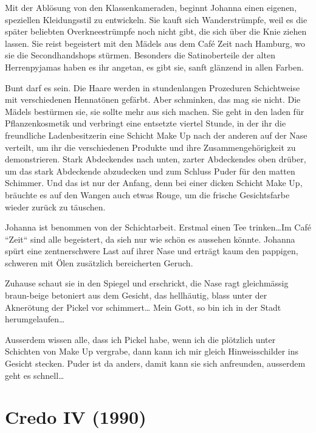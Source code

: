 \documentclass[10pt,titlepage,a5paper]{book}
\begin{document}
Mit der Ablösung von den Klassenkameraden, beginnt Johanna einen eigenen, speziellen Kleidungsstil zu entwickeln. Sie kauft sich Wanderstrümpfe, weil es die später beliebten Overkneestrüm\-pfe noch nicht gibt, die sich über die Knie ziehen lassen. Sie reist begeistert mit den Mädels aus dem Café Zeit nach Hamburg, wo sie die Secondhandshops stürmen. Besonders die Satinoberteile der alten Herrenpyjamas haben es ihr angetan, es gibt sie, sanft glänzend in allen Farben. 

Bunt darf es sein. Die Haare werden in stundenlangen Prozeduren Schichtweise mit verschiedenen Hennatönen gefärbt. Aber schminken, das mag sie nicht. Die Mädels bestürmen sie, sie sollte mehr aus sich machen. Sie geht in den laden für Pflanzenkosmetik und verbringt eine entsetzte viertel Stunde, in der ihr die freundliche Ladenbesitzerin eine Schicht Make Up nach der anderen auf der Nase verteilt, um ihr die verschiedenen Produkte und ihre Zusammengehörigkeit zu demonstrieren. Stark Abdeckendes nach unten, zarter Abdeckendes oben drüber, um das stark Abdeckende abzudecken und zum Schluss Puder für den matten Schimmer. Und das ist nur der Anfang, denn bei einer dicken Schicht Make Up, bräuchte es auf den Wangen auch etwas Rouge, um die frische Gesichtsfarbe wieder zurück zu täuschen. 

Johanna ist benommen von der Schichtarbeit. Erstmal einen Tee trinken\dots  Im Café ``Zeit`` sind alle begeistert, da sieh nur wie schön es aussehen könnte. Johanna spürt eine zentnerschwere Last auf ihrer Nase und erträgt kaum den pappigen, schweren mit Ölen zusätzlich bereicherten Geruch.

Zuhause schaut sie in den Spiegel und erschrickt, die Nase ragt gleichmässig braun-beige betoniert aus dem Gesicht, das hell\-häutig, blass unter der Aknerötung der Pickel vor schimmert\dots{} Mein Gott, so bin ich in der Stadt herumgelaufen\dots 

Ausserdem wissen alle, dass ich Pickel habe, wenn ich die plötzlich unter Schichten von Make Up vergrabe, dann kann ich mir gleich Hinweisschilder ins Gesicht stecken. Puder ist da anders, damit kann sie sich anfreunden, ausserdem geht es schnell\dots 



\section*{Credo IV (1990)}
\end{document}
